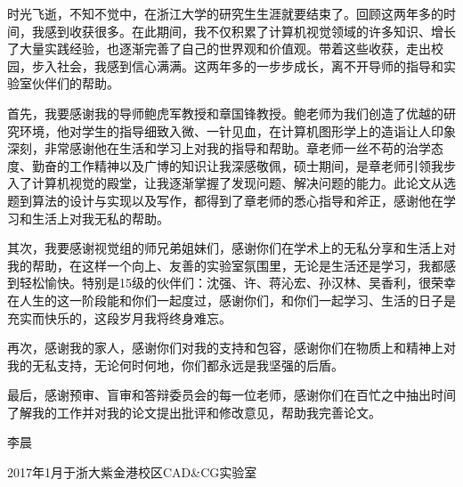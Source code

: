\begin{thanks}

  时光飞逝，不知不觉中，在浙江大学的研究生生涯就要结束了。回顾这两年多的时间，我感到收获很多。在此期间，我不仅积累了计算机视觉领域的许多知识、增长了大量实践经验，也逐渐完善了自己的世界观和价值观。带着这些收获，走出校园，步入社会，我感到信心满满。这两年多的一步步成长，离不开导师的指导和实验室伙伴们的帮助。

  首先，我要感谢我的导师鲍虎军教授和章国锋教授。鲍老师为我们创造了优越的研究环境，他对学生的指导细致入微、一针见血，在计算机图形学上的造诣让人印象深刻，非常感谢他在生活和学习上对我的指导和帮助。章老师一丝不苟的治学态度、勤奋的工作精神以及广博的知识让我深感敬佩，硕士期间，是章老师引领我步入了计算机视觉的殿堂，让我逐渐掌握了发现问题、解决问题的能力。此论文从选题到算法的设计与实现以及写作，都得到了章老师的悉心指导和斧正，感谢他在学习和生活上对我无私的帮助。

  其次，我要感谢视觉组的师兄弟姐妹们，感谢你们在学术上的无私分享和生活上对我的帮助，在这样一个向上、友善的实验室氛围里，无论是生活还是学习，我都感到轻松愉快。特别是15级的伙伴们：沈强、许\yan、蒋沁宏、孙汉林、吴香利，很荣幸在人生的这一阶段能和你们一起度过，感谢你们，和你们一起学习、生活的日子是充实而快乐的，这段岁月我将终身难忘。

  再次，感谢我的家人，感谢你们对我的支持和包容，感谢你们在物质上和精神上对我的无私支持，无论何时何地，你们都永远是我坚强的后盾。

  最后，感谢预审、盲审和答辩委员会的每一位老师，感谢你们在百忙之中抽出时间了解我的工作并对我的论文提出批评和修改意见，帮助我完善论文。


  \vspace*{\fill}
  \begin{flushright}
    李晨

    2017年1月于浙大紫金港校区CAD\&CG实验室
  \end{flushright}

\end{thanks}
